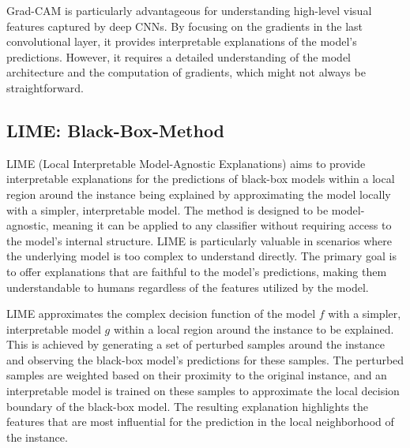 \documentclass{article}
\begin{document}
Grad-CAM is particularly advantageous for understanding high-level visual features captured by deep CNNs. By focusing on the gradients in the last convolutional layer, it provides interpretable explanations of the model’s predictions. However, it requires a detailed understanding of the model architecture and the computation of gradients, which might not always be straightforward.


\subsection{LIME: Black-Box-Method}

LIME (Local Interpretable Model-Agnostic Explanations) aims to provide interpretable explanations for the predictions of black-box models within a local region around the instance being explained by approximating the model locally with a simpler, interpretable model. The method is designed to be model-agnostic, meaning it can be applied to any classifier without requiring access to the model’s internal structure. LIME is particularly valuable in scenarios where the underlying model is too complex to understand directly. The primary goal is to offer explanations that are faithful to the model’s predictions, making them understandable to humans regardless of the features utilized by the model.

LIME approximates the complex decision function of the model $f$ with a simpler, interpretable model $g$ within a local region around the instance to be explained. This is achieved by generating a set of perturbed samples around the instance and observing the black-box model’s predictions for these samples. The perturbed samples are weighted based on their proximity to the original instance, and an interpretable model is trained on these samples to approximate the local decision boundary of the black-box model. The resulting explanation highlights the features that are most influential for the prediction in the local neighborhood of the instance.
\end{document}
